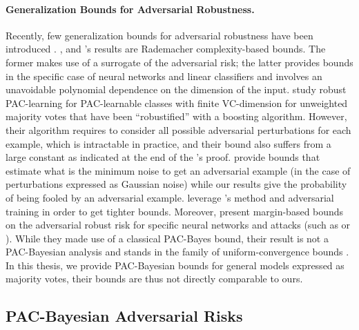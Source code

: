 \paragraph{Generalization Bounds for Adversarial Robustness.}
Recently, few generalization bounds for adversarial robustness have been introduced \citep[\eg,][]{KhimLoh2018,YinRamchandranBartlett2019,MontasserHannekeSrebro2019,MontasserHannekeSrebro2020,CohenRosenfeldZicoKolter2019,SalmanLiRazenshteynZhangZhangBubeckYang2019,PinotMeunierAraujoKashimaYgerGouyPaillerAtif2019,PinotMeunierYgerGouyPaillerChevaleyreAtif2022}.
\citeauthor{KhimLoh2018}, and \citeauthor{YinRamchandranBartlett2019}'s results are Rademacher complexity-based bounds. 
The former makes use of a surrogate of the adversarial risk; the latter provides bounds in the specific case of neural networks and linear classifiers and involves an unavoidable polynomial dependence on the dimension of the input.
\citeauthor{MontasserHannekeSrebro2020}
study robust PAC-learning for PAC-learnable classes with finite VC-dimension for unweighted majority votes that have been ``robustified'' with a boosting algorithm. 
However, their algorithm requires to consider all possible adversarial perturbations for each example, which is intractable in practice, and their bound also suffers from a large constant as indicated at the end of the \citet[Theorem 3.1][]{MontasserHannekeSrebro2019}'s proof.
\citeauthor{CohenRosenfeldZicoKolter2019} provide bounds that estimate what is the minimum noise to get an adversarial example (in the case of perturbations expressed as Gaussian noise) while our results give the probability of being fooled by an adversarial example.
\citeauthor{SalmanLiRazenshteynZhangZhangBubeckYang2019} leverage \citeauthor{CohenRosenfeldZicoKolter2019}'s method and adversarial training in order to get tighter bounds.
Moreover, \citeauthor{FarniaZhangTse2019} present margin-based bounds on the adversarial robust  risk for specific neural networks and attacks (such as \FGSM or \PGD).
While they made use of a classical PAC-Bayes bound, their result is not a PAC-Bayesian analysis  and stands in the family of uniform-convergence bounds \citep[see][Ap.~J for details]{NagarajanKolter2019}. 
In this thesis, we provide PAC-Bayesian bounds for general models expressed as majority votes, their bounds are thus not directly comparable to ours.

\subsection{PAC-Bayesian Adversarial Risks}

